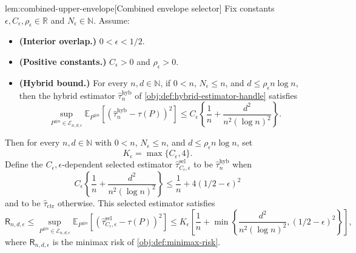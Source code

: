 \begin{lemmav}{lem:combined-upper-envelope}[Combined envelope selector]
Fix constants \(\epsilon,C_\epsilon,\rho_\epsilon\in\mathbb R\) and \(N_\epsilon\in\mathbb N\). Assume:
\begin{itemize}
\item \textbf{(Interior overlap.)} \(0<\epsilon<1/2\).
\item \textbf{(Positive constants.)} \(C_\epsilon>0\) and \(\rho_\epsilon>0\).
\item \textbf{(Hybrid bound.)} For every \(n,d\in\mathbb N\), if \(0<n\), \(N_\epsilon\le n\), and \(d\le \rho_\epsilon n\log n\), then the hybrid estimator \(\widehat\tau_n^{\mathrm{hyb}}\) of \cref{obj:def:hybrid-estimator-handle} satisfies
\[
\sup_{P^{\otimes n}\in\mathcal E_{n,d,\epsilon}}
\mathbb E_{P^{\otimes n}}\!\left[\left(\widehat\tau_n^{\mathrm{hyb}}-\tau(P)\right)^2\right]
\le
C_\epsilon\left\{\frac1n+\frac{d^2}{n^2(\log n)^2}\right\}.
\]
\end{itemize}
Then for every \(n,d\in\mathbb N\) with \(0<n\), \(N_\epsilon\le n\), and \(d\le \rho_\epsilon n\log n\), set
\[
K_\epsilon=\max\{C_\epsilon,4\}.
\]
Define the \(C_\epsilon,\epsilon\)-dependent selected estimator \(\widehat\tau^{\mathrm{sel}}_{C_\epsilon,\epsilon}\) to be \(\widehat\tau_n^{\mathrm{hyb}}\) when
\[
C_\epsilon\left\{\frac1n+\frac{d^2}{n^2(\log n)^2}\right\}
\le
\frac1n+4(1/2-\epsilon)^2
\]
and to be \(\widehat\tau_{\mathrm{ctr}}\) otherwise. This selected estimator satisfies
\[
\mathsf R_{n,d,\epsilon}\le
\sup_{P^{\otimes n}\in\mathcal E_{n,d,\epsilon}}
\mathbb E_{P^{\otimes n}}\!\left[\left(\widehat\tau^{\mathrm{sel}}_{C_\epsilon,\epsilon}-\tau(P)\right)^2\right]
\le
K_\epsilon\left[
\frac1n+
\min\left\{\frac{d^2}{n^2(\log n)^2},(1/2-\epsilon)^2\right\}
\right],
\]
where \(\mathsf R_{n,d,\epsilon}\) is the minimax risk of \cref{obj:def:minimax-risk}.
\end{lemmav}

